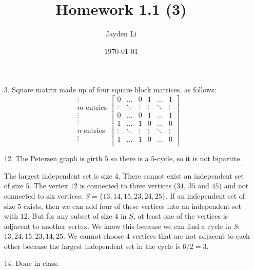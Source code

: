 \documentclass{article}
\title{\vspace*{-40pt}Homework 1.1 (3)}
\author{Jayden Li}
\date{\today}
\begin{document}
\fontsize{12pt}{12pt}\selectfont
\maketitle

\begin{enumerate}
\item[3.]
	Square matrix made up of four square block matrices, as follows:
	\begin{equation*}
		\begin{array}{c}
			\vdots \\
			\text{$m$ entries} \\
			\vdots \\
			\hline
			\vdots \\
			\text{$n$ entries} \\
			\vdots \\
		\end{array}
		\left[\begin{array}{ccc|ccc}
			0 & \ldots & 0 & 1 & \ldots & 1 \\
			\vdots & \ddots & \vdots & \vdots & \ddots & \vdots \\
			0 & \ldots & 0 & 1 & \ldots & 1 \\
			\hline
			1 & \ldots & 1 & 0 & \ldots & 0 \\
			\vdots & \ddots & \vdots & \vdots & \ddots & \vdots \\
			1 & \ldots & 1 & 0 & \ldots & 0 \\
		\end{array}\right]
	\end{equation*}

\item[12.]
	The Petersen graph is girth $5$ so there is a $5$-cycle, so it is not bipartite.

	The largest independent set is size $4$. There cannot exist an independent set of size $5$. The vertex $12$ is connected to three vertices ($34$, $35$ and $45$) and not connected to six vertices: $S=\{13,14,15,23,24,25\}$. If an independent set of size $5$ exists, then we can add four of these vertices into an independent set with $12$. But for any subset of size $4$ in $S$, at least one of the vertices is adjacent to another vertex. We know this because we can find a cycle in $S$: $13,24,15,23,14,25$. We cannot choose $4$ vertices that are not adjacent to each other because the largest independent set in the cycle is $6/2=3$.

\item[14.]
	Done in class.


\end{enumerate}
\end{document}
